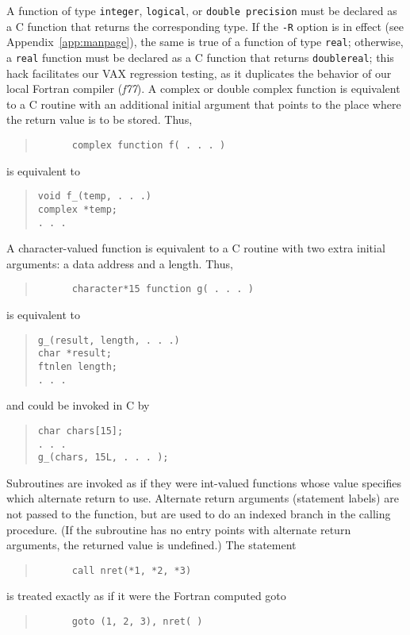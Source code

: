 \documentclass[10pt,a4paper]{article}
\begin{document}
A function of type \verb|integer|, \verb|logical|, or \verb|double precision| must be declared as a C function that returns the corresponding type. If the \verb|-R| option is in effect (see Appendix~\ref{app:manpage}), the same is true of a function of type \verb|real|; otherwise, a \verb|real| function must be declared as a C function that returns \verb|doublereal|; this hack facilitates our VAX regression testing, as it duplicates the behavior of our local Fortran compiler (\emph{f77}). A complex or double complex function is equivalent to a C routine with an additional initial argument that points to the place where the return value is to be stored. Thus,
\begin{quote}
\begin{verbatim}
      complex function f( . . . )
\end{verbatim}
\end{quote}
is equivalent to
\begin{quote}
\begin{verbatim}
void f_(temp, . . .)
complex *temp;
. . .
\end{verbatim}
\end{quote}
A character-valued function is equivalent to a C routine with two extra initial arguments: a data address and a length. Thus,
\begin{quote}
\begin{verbatim}
      character*15 function g( . . . )
\end{verbatim}
\end{quote}
is equivalent to
\begin{quote}
\begin{verbatim}
g_(result, length, . . .)
char *result;
ftnlen length;
. . .
\end{verbatim}
\end{quote}
and could be invoked in C by
\begin{quote}
\begin{verbatim}
char chars[15];
. . .
g_(chars, 15L, . . . );
\end{verbatim}
\end{quote}
Subroutines are invoked as if they were int-valued functions whose value specifies which alternate return to use. Alternate return arguments (statement labels) are not passed to the function, but are used to do an indexed branch in the calling procedure. (If the subroutine has no entry points with alternate return arguments, the returned value is undefined.) The statement
\begin{quote}
\begin{verbatim}
      call nret(*1, *2, *3)
\end{verbatim}
\end{quote}
is treated exactly as if it were the Fortran computed goto
\begin{quote}
\begin{verbatim}
      goto (1, 2, 3), nret( )
\end{verbatim}
\end{quote}
\end{document}
